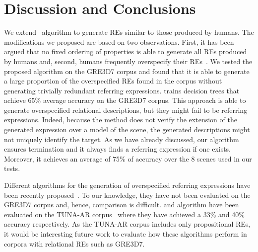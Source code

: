 \section{Discussion and Conclusions} \label{sec:discussion}

We extend~ algorithm to generate REs similar to those produced by humans. The modifications 
we proposed are based on two observations. First, it has been argued that no fixed ordering of properties is able to generate all REs produced by humans and, second, humans frequently overspecify their REs~\cite{Engelhardt_Bailey_Ferreira_2006,Arts_Maes_Noordman_Jansen_2011,viet:gene11}. We tested 
the proposed algorithm on the GRE3D7 corpus and found that it is able to generate a large proportion of the overspecified REs found in the corpus without generating trivially redundant referring expressions.
%
 trains decision trees that achieve 65\% average accuracy on the GRE3D7 corpus. 
This approach is able to generate overspecified relational descriptions, but they might fail to be referring 
expressions. Indeed, because the  method does not verify the extension of the generated expression over a model of the scene, the 
generated descriptions might not uniquely identify the target.  As we have already discussed,
our algorithm ensures termination and it always finds a referring expression if one exists.  Moreover, it achieves an average of 75\% of accuracy over the 8 scenes used in our tests. 

Different algorithms for the generation of overspecified referring expressions have been recently proposed~\cite{delucena-paraboni:2008:ENLG,ruud-emiel-mariet:2012:INLG2012}.  To our knowledge, they have not been evaluated on the 
GRE3D7 corpus and, hence, comparison is difficult.  and  algorithm
have been evaluated on the TUNA-AR corpus~\cite{gatt-balz-kow:2008:ENLG} where they have achieved a 33\% and 40\% accuracy respectively. 
As the TUNA-AR corpus includes only propositional REs, it would be interesting future work to evaluate how these algorithms perform in corpora with relational REs such as GRE3D7. 


